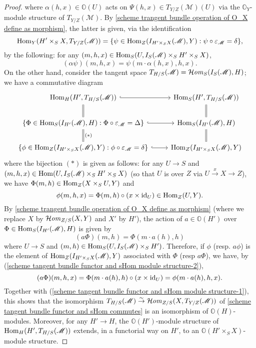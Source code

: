 \begin{proof}
where $\alpha(h,x)\in\mathbb{O}(U)$ acts on $\Psi(h,x)\in T_{Y/Z}(\mathscr{M})(U)$ via the $\mathbb{O}_Y$-module structure of $T_{Y/Z}(\mathscr{M})$. By \cref{scheme trangent bundle operation of O_X define as morphism}, the latter is given, via the identification
\[\mathrm{Hom}_Y(H'\times_SX,T_{Y/Z}(\mathscr{M}))=\{\psi\in\mathrm{Hom}_Z(I_{H'\times_SX}(\mathscr{M}),Y):\psi\circ\varepsilon_\mathscr{M}=\delta\},\]
by the following: for any $(m,h,x)\in\mathrm{Hom}_S(U,I_S(\mathscr{M})\times_SH'\times_SX)$,
\begin{equation}\label{scheme tangent bundle functor and sHom module structure-1}
(\alpha\psi)(m,h,x)=\psi(m\cdot\alpha(h,x),h,x).
\end{equation}
On the other hand, consider the tangent space $T_{H/S}(\mathscr{M})=\operatorname{\mathcal{H}\hspace*{-0.4pt}\textit{om}\hspace{0.5pt}}_S(I_S(\mathscr{M}),H)$; we have a commutative diagram
\[\begin{tikzcd}
\Hom_H(H',T_{H/S}(\mathscr{M}))\ar[r,hook]\ar[d,equal]&\Hom_S(H',T_{H/S}(\mathscr{M}))\ar[d,equal]\\
\{\Phi\in\Hom_S(I_{H'}(\mathscr{M}),H):\Phi\circ\eps_\mathscr{M}=\Delta\}\ar[r,hook]\ar[d,equal,"(*)"]&\Hom_S(I_{H'}(\mathscr{M}),H)\ar[d,equal]\\
\{\phi\in\Hom_Z(I_{H'\times_SX}(\mathscr{M}),Y):\phi\circ\eps_\mathscr{M}=\delta\}\ar[r,hook]&\Hom_Z(I_{H'\times_SX}(\mathscr{M}),Y)
\end{tikzcd}\]
where the bijection $(*)$ is given as follows: for any $U\to S$ and $(m,h,x)\in\mathrm{Hom}(U,I_S(\mathscr{M})\times_SH'\times_SX)$ (so that $U$ is over $Z$ via $U\stackrel{x}{\to}X\to Z$), we have $\Phi(m,h)\in\mathrm{Hom}_Z(X\times_SU,Y)$ and
\begin{equation}\label{scheme tangent bundle functor and sHom module structure-2}
\phi(m,h,x)=\Phi(m,h)\circ(x\times\operatorname{id}_U)\in\mathrm{Hom}_Z(U,Y).
\end{equation}
By \cref{scheme trangent bundle operation of O_X define as morphism} (where we replace $X$ by $\operatorname{\mathcal{H}\hspace*{-0.4pt}\textit{om}\hspace{0.5pt}}_{Z/S}(X,Y)$ and $X'$ by $H'$), the action of $a\in\mathbb{O}(H')$ over $\Phi\in\mathrm{Hom}_S(I_{H'}(\mathscr{M}),H)$ is given by
\[(a\Phi)(m,h)=\Phi(m\cdot a(h),h)\]
where $U\to S$ and $(m,h)\in\mathrm{Hom}_S(U,I_S(\mathscr{M})\times_SH')$. Therefore, if $\phi$ (resp. $a\phi$) is the element of $\mathrm{Hom}_Z(I_{H'\times_SX}(\mathscr{M}),Y)$ associated with $\Phi$ (resp $a\Phi$), we have, by (\ref{scheme tangent bundle functor and sHom module structure-2}),
\begin{equation}
(a\Phi)(m,h,x)=\Phi(m\cdot a(h),h)\circ(x\times\operatorname{id}_U)=\phi(m\cdot a(h),h,x).
\end{equation}
Together with (\ref{scheme tangent bundle functor and sHom module structure-1}), this shows that the isomorphism $T_{H/S}(\mathscr{M})\stackrel{\sim}{\to} \operatorname{\mathcal{H}\hspace*{-0.4pt}\textit{om}\hspace{0.5pt}}_{Z/S}(X,T_{Y/Z}(\mathscr{M}))$ of \cref{scheme tangent bundle functor and sHom commutes} is an isomorphism of $\mathbb{O}(H)$-modules. Moreover, for any $H'\to H$, the $\mathbb{O}(H')$-module structure of $\mathrm{Hom}_H(H',T_{H/S}(\mathscr{M}))$ extends, in a functorial way on $H'$, to an $\mathbb{O}(H'\times_SX)$-module structure.
\end{proof}

